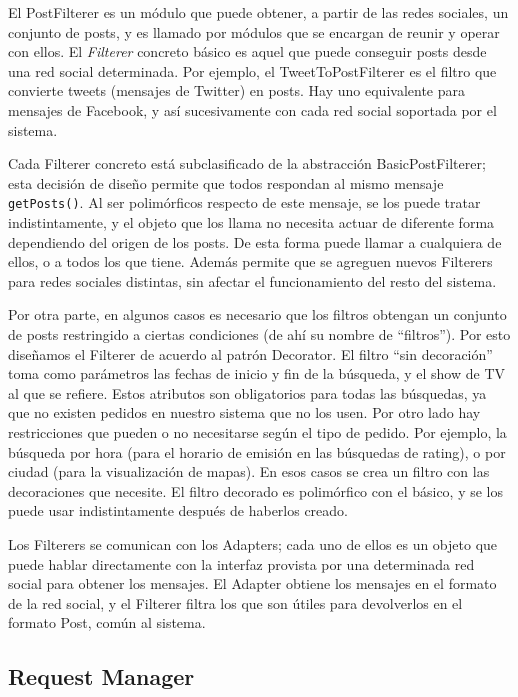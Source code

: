 El PostFilterer es un módulo que puede obtener, a partir de las redes sociales, un conjunto de posts, y es llamado por módulos que se encargan de reunir y operar con ellos. El \emph{Filterer} concreto básico es aquel que puede conseguir posts desde una red social determinada. Por ejemplo, el TweetToPostFilterer es el filtro que convierte tweets (mensajes de Twitter) en posts. Hay uno equivalente para mensajes de Facebook, y así sucesivamente con cada red social soportada por el sistema.

Cada Filterer concreto está subclasificado de la abstracción BasicPostFilterer; esta decisión de diseño permite que todos respondan al mismo mensaje \texttt{getPosts()}. Al ser polimórficos respecto de este mensaje, se los puede tratar indistintamente, y el objeto que los llama no necesita actuar de diferente forma dependiendo del origen de los posts. De esta forma puede llamar a cualquiera de ellos, o a todos los que tiene. Además permite que se agreguen nuevos Filterers para redes sociales distintas, sin afectar el funcionamiento del resto del sistema.
\bigskip

Por otra parte, en algunos casos es necesario que los filtros obtengan un conjunto de posts restringido a ciertas condiciones (de ahí su nombre de ``filtros''). Por esto diseñamos el Filterer de acuerdo al patrón Decorator. El filtro ``sin decoración'' toma como parámetros las fechas de inicio y fin de la búsqueda, y el show de TV al que se refiere. Estos atributos son obligatorios para todas las búsquedas, ya que no existen pedidos en nuestro sistema que no los usen. Por otro lado hay restricciones que pueden o no necesitarse según el tipo de pedido. Por ejemplo, la búsqueda por hora (para el horario de emisión en las búsquedas de rating), o por ciudad (para la visualización de mapas). En esos casos se crea un filtro con las decoraciones que necesite. El filtro decorado es polimórfico con el básico, y se los puede usar indistintamente después de haberlos creado.
\bigskip

Los Filterers se comunican con los Adapters; cada uno de ellos es un objeto que puede hablar directamente con la interfaz provista por una determinada red social para obtener los mensajes. El Adapter obtiene los mensajes en el formato de la red social, y el Filterer filtra los que son útiles para devolverlos en el formato Post, común al sistema.

\subsection{Request Manager}

